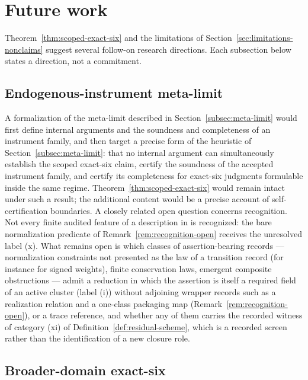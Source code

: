\section{Future work}\label{sec:future-work}


Theorem~\ref{thm:scoped-exact-six} and the limitations of
Section~\ref{sec:limitations-nonclaims} suggest several follow-on
research directions. Each subsection below states a direction, not a
commitment.

\subsection{Endogenous-instrument meta-limit}\label{subsec:future-meta-limit}

A formalization of the meta-limit described in
Section~\ref{subsec:meta-limit} would first define internal arguments and the soundness and completeness of
an instrument family, and then target a precise form of the heuristic of
Section~\ref{subsec:meta-limit}: that no internal argument can simultaneously
establish the scoped exact-six claim, certify the soundness of the
accepted instrument family, and certify its completeness for
exact-six judgments formulable inside the same regime.
Theorem~\ref{thm:scoped-exact-six} would remain intact under such a
result; the additional content would be a precise account of
self-certification boundaries. A closely related open question
concerns recognition. Not every finite audited feature of a description in
\FATCD{} is recognized: the bare normalization predicate of
Remark~\ref{rem:recognition-open} receives the unresolved label (x). What remains open is
which classes of assertion-bearing records --- normalization constraints not
presented as the law of a transition record (for instance for signed weights),
finite conservation laws, emergent composite obstructions --- admit a reduction
in which the assertion is itself a required field of an active cluster
(label (i)) without adjoining wrapper records such as a realization relation
and a one-class packaging map (Remark~\ref{rem:recognition-open}), or a trace
reference, and whether any of
them carries the recorded witness of category (xi) of
Definition~\ref{def:residual-scheme}, which is a recorded screen rather than
the identification of a new closure role.

\subsection{Broader-domain exact-six}\label{subsec:future-broader-domain}

